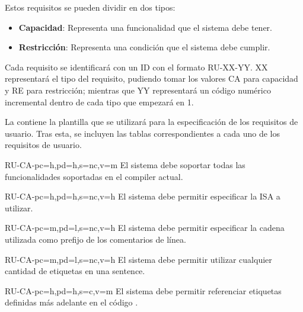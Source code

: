 \noindent
Estos requisitos se pueden dividir en dos tipos:

\begin{itemize}
    \item \textbf{Capacidad}: Representa una funcionalidad que el sistema debe tener.
    \item \textbf{Restricción}: Representa una condición que el sistema debe cumplir.
\end{itemize}

Cada requisito se identificará con un ID con el formato RU-XX-YY. XX
representará el tipo del requisito, pudiendo tomar los valores CA para capacidad
y RE para restricción; mientras que YY representará un código numérico incremental
dentro de cada tipo que empezará en 1.

La  contiene la plantilla que se utilizará para la
especificación de los requisitos de usuario. Tras esta, se incluyen las tablas
correspondientes a cada uno de los requisitos de usuario.




\setcounter{i}{1}

\begin{userReq}{RU-CA-}{pc=h,pd=h,s=nc,v=m}
    El sistema debe soportar todas las funcionalidades soportadas en el
    \gls{compiler} actual.
\end{userReq}

\begin{userReq}{RU-CA-}{pc=h,pd=h,s=nc,v=h}
    El sistema debe permitir especificar la \gls{ISA} a utilizar.
\end{userReq}

\begin{userReq}{RU-CA-}{pc=m,pd=l,s=nc,v=h}
    El sistema debe permitir especificar la cadena utilizada como prefijo de los
    comentarios de línea.
\end{userReq}

\begin{userReq}{RU-CA-}{pc=m,pd=l,s=nc,v=h}
    El sistema debe permitir utilizar cualquier cantidad de etiquetas en una
    \gls{sentence}.
\end{userReq}

\begin{userReq}{RU-CA-}{pc=h,pd=h,s=c,v=m}
    El sistema debe permitir referenciar etiquetas definidas más adelante en el
    código .
\end{userReq}

